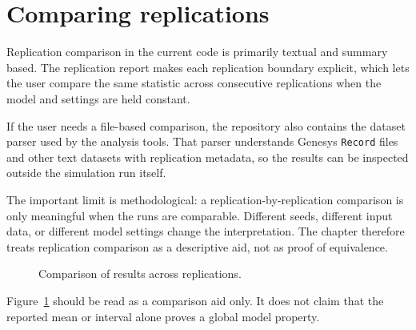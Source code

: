 \section{Comparing replications}
\label{sec:results-replication-comparison}

Replication comparison in the current code is primarily textual and summary
based. The replication report makes each replication boundary explicit, which
lets the user compare the same statistic across consecutive replications when
the model and settings are held constant.

If the user needs a file-based comparison, the repository also contains the
dataset parser used by the analysis tools. That parser understands Genesys
\texttt{Record} files and other text datasets with replication metadata, so the
results can be inspected outside the simulation run itself.

The important limit is methodological: a replication-by-replication comparison
is only meaningful when the runs are comparable. Different seeds, different
input data, or different model settings change the interpretation. The chapter
therefore treats replication comparison as a descriptive aid, not as proof of
equivalence.

\begin{figure}[htbp]
\centering
\caption{Comparison of results across replications.}
\label{fig:results-replication-comparison}
\end{figure}

Figure~\ref{fig:results-replication-comparison} should be read as a comparison
aid only. It does not claim that the reported mean or interval alone proves a
global model property.

